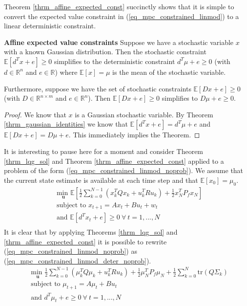 Theorem \ref{thrm_affine_expected_const} succinctly shows that it is simple to convert the expected value constraint in (\ref{eq_mpc_constrained_linmod}) to a linear deterministic constraint.
\begin{thrm}
\textbf{Affine expected value constraints} Suppose we have a stochastic variable $x$ with a known Gaussian distribution. Then the stochastic constraint $\mathbb{E}[d^Tx + e] \geq 0$ simplifies to the deterministic constraint $d^T\mu + e \geq 0$ (with $d \in \mathbb{R}^{n}$ and $e \in \mathbb{R}$) where $\mathbb{E}[x]= \mu$ is the mean of the stochastic variable. 

Furthermore, suppose we have the set of stochastic constraints $\mathbb{E}[Dx + e] \geq 0$ (with $D \in \mathbb{R}^{n \times m}$ and $e \in \mathbb{R}^n$). Then $\mathbb{E}[Dx + e] \geq 0$ simplifies to $D\mu + e \geq 0$.  
\label{thrm_affine_expected_const}
\end{thrm}
\begin{proof}
We know that $x$ is a Gaussian stochastic variable. By Theorem \ref{thrm_gaussian_identities} we know that $\mathbb{E}[d^Tx + e] =d^T\mu + e$ and $\mathbb{E}[Dx + e] = D\mu + e$. This immediately implies the Theorem.
\end{proof}
It is interesting to pause here for a moment and consider Theorem \ref{thrm_lqg_sol} and Theorem \ref{thrm_affine_expected_const} applied to a problem of the form (\ref{eq_mpc_constrained_linmod_noprob}). We assume that the current state estimate is available at each time step and that $\mathbb{E}[x_0]=\mu_0$.
\begin{equation}
\begin{aligned}
&\underset{\mathbf{u}}{\text{min }} \mathbb{E}\left[ \frac{1}{2}\sum_{k=0}^{N-1} \left( x_k^TQx_k + u_k^TRu_k \right) + \frac{1}{2}x_N^TP_fx_N \right] \\
& \text{subject to } x_{t+1}=Ax_t+Bu_t + w_t \\
& \text{and } \mathbb{E}[d^Tx_t + e] \geq 0 ~\forall ~t=1,...,N \\
\end{aligned}
\label{eq_mpc_constrained_linmod_noprob}
\end{equation}
It is clear that by applying Theorems \ref{thrm_lqg_sol} and \ref{thrm_affine_expected_const} it is possible to rewrite (\ref{eq_mpc_constrained_linmod_noprob}) as (\ref{eq_mpc_constrained_linmod_deter_noprob}).
\begin{equation}
\begin{aligned}
&\underset{\mathbf{u}}{\text{min }} \frac{1}{2}\sum_{k=0}^{N-1} \left( \mu_k^TQ\mu_k + u_k^TRu_k \right) + \frac{1}{2}\mu_N^TP_f\mu_N + \frac{1}{2}\sum_{k=0}^N \text{tr}(Q\Sigma_k) \\
& \text{subject to } \mu_{t+1}=A\mu_t + Bu_t \\
& \text{and } d^T\mu_t + e \geq 0 ~\forall ~t=1,...,N\\
\end{aligned}
\label{eq_mpc_constrained_linmod_deter_noprob}
\end{equation}
